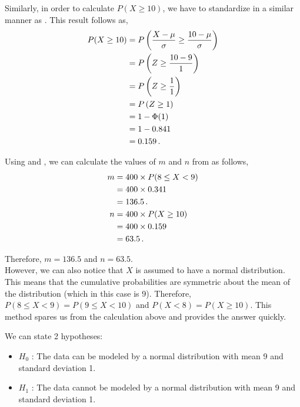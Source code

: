 \begin{subquestions}
\begin{subsubquestions}
Similarly, in order to calculate $P(X \geq 10)$, we have to standardize in a similar manner as . This result follows as,
\begin{align}
	P(X \geq 10) & = P\left(\frac{X-\mu}{\sigma} \geq \frac{10 - \mu}{\sigma} \right) \nonumber \\
	             & = P\left(Z \geq \frac{10-9}{1}\right) \nonumber \\
	             & = P\left(Z \geq \frac{1}{1}\right) \nonumber \\
	             & = P\left(Z \geq 1\right) \nonumber \\
	             & = 1 - \Phi(1) \nonumber \\
	             & = 1 - 0.841 \nonumber \\
	             & = 0.159 \,. \label{2015:q4:Normal2}
\end{align}

Using  and , we can calculate the values of $m$ and $n$ from  as follows,
\begin{align}
	m & = 400 \times P(8 \leq X < 9) \nonumber \\
	  & = 400 \times 0.341 \nonumber \\
	  & = 136.5 \,. \\
    n & = 400 \times P(X \geq 10) \nonumber \\
      & = 400 \times 0.159 \nonumber \\
      & = 63.5 \,.
\end{align}

Therefore, $m=136.5$ and $n=63.5$. \\

However, we can also notice that $X$ is assumed to have a normal distribution. This means that the cumulative probabilities are symmetric about the mean of the distribution (which in this case is 9). Therefore, $P(8 \leq X < 9) = P(9 \leq X < 10)$ and $P(X < 8) = P(X \geq 10)$. This method spares us from the calculation above and provides the answer quickly.


\subsubquestion

We can state 2 hypotheses:
\begin{itemize}
	\item $H_0$ : The data can be modeled by a normal distribution with mean 9 and standard deviation 1.
	\item $H_1$ : The data cannot be modeled by a normal distribution with mean 9 and standard deviation 1.
\end{itemize}


\end{subsubquestions}
\end{subquestions}
